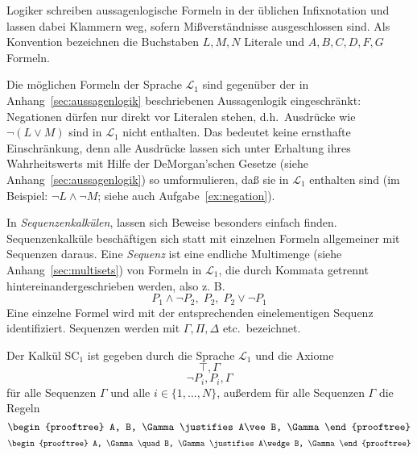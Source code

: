 Logiker schreiben aussagenlogische Formeln in
der üblichen Infixnotation und lassen dabei Klammern weg, sofern
Mißverständnisse ausgeschlossen sind.
%
Als Konvention bezeichnen die Buchstaben $L, M, N$  Literale 
und $A, B, C, D, F, G$ Formeln.

Die möglichen Formeln der Sprache $\mathcal{L}_1$ sind gegenüber der
in Anhang~\ref{sec:aussagenlogik} beschriebenen Aussagenlogik eingeschränkt:
Negationen dürfen nur direkt vor Literalen stehen, d.h.\ Ausdrücke wie
$\neg(L\vee M)$ sind in $\mathcal{L}_1$ nicht enthalten.  Das bedeutet 
keine ernsthafte Einschränkung, denn alle Ausdrücke lassen sich unter Erhaltung 
ihres Wahrheitswerts
mit Hilfe der DeMorgan'schen Gesetze (siehe Anhang~\ref{sec:aussagenlogik})
so umformulieren, daß sie in $\mathcal{L}_1$ enthalten
sind (im Beispiel: $\neg L\wedge \neg M$; siehe auch
Aufgabe~\ref{ex:negation}). 

In \textit{Sequenzenkalkülen},
lassen sich Beweise besonders einfach finden.
Sequenzenkalküle beschäftigen sich statt mit einzelnen Formeln
allgemeiner mit Sequenzen daraus.
Eine \textit{Sequenz} ist eine endliche Multimenge
(siehe Anhang~\ref{sec:multisets}) von Formeln in
$\mathcal{L}_1$, die durch Kommata getrennt
hintereinandergeschrieben werden, also z. B.\
\[P_1\wedge\neg P_2,\; P_2,\; P_2\vee\neg P_1\] 
Eine einzelne Formel wird mit der entsprechenden einelementigen Sequenz
identifiziert.  
Sequenzen werden mit $\Gamma, \Pi, \Delta$ etc.\ bezeichnet.  


\begin{definition}[Kalkül SC$_1$]
Der Kalkül SC$_1$ ist gegeben durch die Sprache $\mathcal{L}_1$ und die
Axiome 
%
\begin{equation}
\top, \Gamma
\label{S1}
\end{equation}
\begin{equation}
\neg P_i, P_i, \Gamma
\label{S2}
\end{equation}
für alle Sequenzen $\Gamma$ und alle $i\in\{1,\ldots,N\}$, außerdem für alle
Sequenzen $\Gamma$ die Regeln
%
\begin{equation}
\begin{prooftree}
  A, B, \Gamma \justifies A\vee B, \Gamma
\end{prooftree}
\label{Sd}
\end{equation}
\begin{equation}
  \begin{prooftree}
    A, \Gamma \quad B, \Gamma \justifies A\wedge B, \Gamma
  \end{prooftree}
\label{Sc}
\end{equation}
%
\end{definition}

